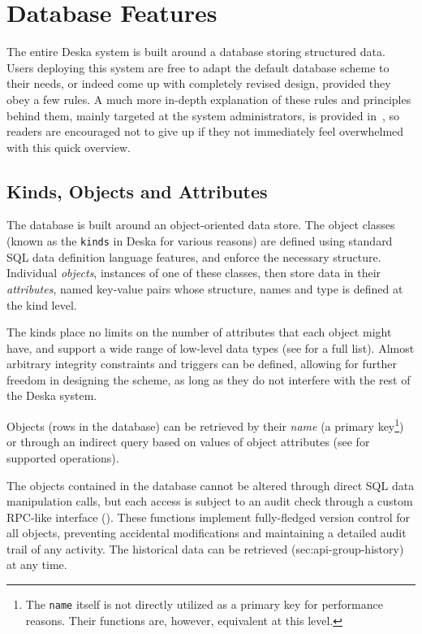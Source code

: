 \documentclass[deska]{subfiles}
\begin{document}
\section{Database Features}

The entire Deska system is built around a database storing structured data.  Users deploying this system are free to
adapt the default database scheme to their needs, or indeed come up with completely revised design, provided they obey a
few rules.  A much more in-depth explanation of these rules and principles behind them, mainly targeted at the system
administrators, is provided in~, so readers are encouraged not to give up if they not
immediately feel overwhelmed with this quick overview.

\subsection{Kinds, Objects and Attributes}

The database is built around an object-oriented data store.  The object classes (known as the {\tt kinds} in Deska for
various reasons) are defined using standard SQL data definition language features, and enforce the necessary structure.
Individual {\em objects}, instances of one of these classes, then store data in their {\em attributes}, named key-value
pairs whose structure, names and type is defined at the kind level.

The kinds place no limits on the number of attributes that each object might have, and support a wide range of low-level
data types (see  for a full list).  Almost arbitrary integrity constraints and
triggers can be defined, allowing for further freedom in designing the scheme, as long as they do not interfere with the
rest of the Deska system.

Objects (rows in the database) can be retrieved by their {\em name} (a primary key\footnote{The {\tt name} itself is not
directly utilized as a primary key for performance reasons.  Their functions are, however, equivalent at this level.})
or through an indirect query based on values of object attributes (see  for supported
operations).

The objects contained in the database cannot be altered through direct SQL data manipulation calls, but each access is
subject to an audit check through a custom RPC-like interface ().  These
functions implement fully-fledged version control for all objects, preventing accidental modifications and maintaining a
detailed audit trail of any activity.  The historical data can be retrieved ({sec:api-group-history}) at any time.
\end{document}

